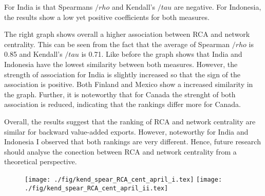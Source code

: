 For India is that Spearmans $/rho$ and  Kendall's  $/tau$ are negative.
For Indonesia, the results show a low yet positive coefficients for both measures.
\par
The right graph shows overall a higher association between RCA and network centrality.
 This can be seen from the fact that the average of Spearman $/rho$ is  0.85 and Kendall's  $/tau$ is 0.71.
Like before the graph shows that India and Indonesia have the lowest similarity between both measures.
However, the strength of association for India is slightly increased so that the sign of the association is positive.
Both Finland and Mexico show a increased similarity in the graph.
Further, it is noteworthy that for Canada the strenght of both association is reduced, indicating that the
rankings differ more for Canada. \par
 Overall, the results suggest that the ranking of RCA and network centrality are similar for backward value-added exports.
  However, noteworthy for India and Indonesia I observed that both rankings are very different.
  Hence, future research should analyse the conection between RCA and network centrality from a theoretical perspective.

 \begin{figure}[H]
  \centering
\texttt{[image: ./fig/kend\_spear\_RCA\_cent\_april\_i.tex]}
\texttt{[image: ./fig/kend\_spear\_RCA\_cent\_april\_ii.tex]}
\end{figure}
\endinput

